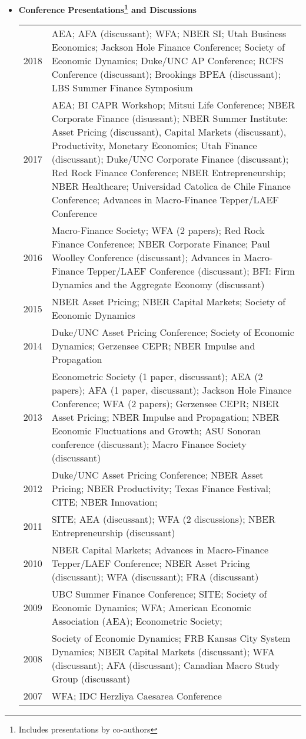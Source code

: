 \documentclass[12pt,letterpaper,serif,overlapped]{res}
\begin{document}
\begin{resume}
\begin{itemize}
\item \textbf{Conference Presentations\footnote[1]{Includes presentations by co-authors} and Discussions}
\begin{longtable}{lp{15cm}}
2018 &  AEA; AFA (discussant); WFA; NBER SI; Utah Business Economics; Jackson Hole Finance Conference; Society of Economic Dynamics; Duke/UNC AP Conference; RCFS Conference (discussant); Brookings BPEA (discussant); LBS Summer Finance Symposium\\[0.1cm]
2017 & AEA; BI CAPR Workshop; Mitsui Life Conference; NBER Corporate Finance (disussant); NBER Summer Institute:  Asset Pricing (discussant), Capital Markets (discussant),  Productivity, Monetary Economics; Utah Finance (discussant); Duke/UNC Corporate Finance (discussant); Red Rock Finance Conference;  NBER Entrepreneurship; NBER Healthcare; Universidad Catolica de Chile Finance Conference; Advances in Macro-Finance Tepper/LAEF Conference \\[0.1cm]
2016 & Macro-Finance Society; WFA (2 papers); Red Rock Finance Conference; NBER Corporate Finance; Paul Woolley Conference (discussant); Advances in Macro-Finance Tepper/LAEF Conference (discussant); BFI: Firm Dynamics and the Aggregate Economy (discussant)\\[0.1cm]
2015 & NBER Asset Pricing;  NBER Capital Markets; Society of Economic Dynamics\\[0.1cm]
2014 & Duke/UNC Asset Pricing Conference; Society of Economic Dynamics; Gerzensee CEPR; NBER Impulse and Propagation\\[0.1cm]
2013 & Econometric Society (1 paper, discussant); AEA (2 papers); AFA (1 paper, discussant); Jackson Hole Finance Conference; WFA (2 papers); Gerzensee CEPR; NBER Asset Pricing; NBER Impulse and Propagation;  NBER Economic Fluctuations and Growth; ASU Sonoran conference (discussant); Macro Finance Society (discussant) \\[0.1cm]
2012 & Duke/UNC Asset Pricing Conference; NBER Asset Pricing; NBER Productivity; Texas Finance Festival; CITE; NBER Innovation;\\[0.1cm]
2011 & SITE; AEA (discussant); WFA (2 discussions); NBER Entrepreneurship (discussant) \\[0.1cm]
2010 & NBER Capital Markets; Advances in Macro-Finance Tepper/LAEF Conference; NBER Asset Pricing (discussant); WFA (discussant); FRA (discussant)  \\[0.1cm]
2009 & UBC Summer Finance Conference; SITE;   Society of Economic Dynamics; WFA; American Economic Association (AEA); Econometric Society;\\[0.1cm]
2008 & Society of Economic Dynamics;   FRB Kansas City System Dynamics; NBER Capital Markets (discussant); WFA (discussant); AFA (discussant); Canadian Macro Study Group (discussant)\\[0.1cm]
2007 & WFA; IDC Herzliya Caesarea Conference\\[0.1cm]
\end{longtable}
\vspace{0.5cm}



\end{itemize}
\end{resume}
\end{document}
